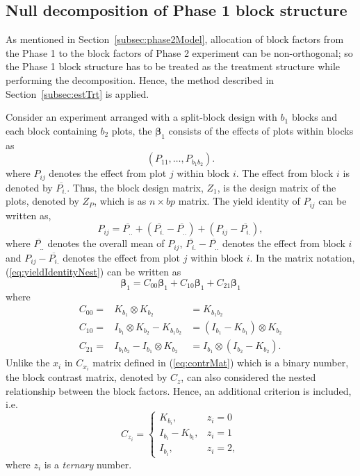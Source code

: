 \documentclass[article]{jss}
\begin{document}
\subsection{Null decomposition of Phase 1 block structure}
As mentioned in Section~\ref{subsec:phase2Model},  allocation of block factors from the Phase 1 to the block factors of Phase 2 experiment can be non-orthogonal; so the Phase 1 block structure has to be treated as the treatment structure while performing the decomposition. Hence, the method described in Section~\ref{subsec:estTrt} is applied. 

Consider an experiment arranged with a split-block design with $b_1$ blocks and each block containing $b_2$ plots, the $\bm{\beta}_1$  consists of the effects of plots within blocks as    
\begin{equation}\label{eq:blockParSplitBlk1}
 (P_{11}, \dots, P_{b_1 b_2}). 
\end{equation}
where $P_{ij}$ denotes the effect from plot $j$ within block $i$. The effect from block $i$ is denoted by $\overline{P_{i.}}$. Thus, the block design matrix, $Z_1$, is the design matrix of the plots, denoted by $Z_P$, which is as $n \times bp$ matrix. The yield identity of $P_{ij}$ can be written as,
\begin{equation}
\label{eq:yieldIdentityNest}
P_{ij} = \overline{P_{..}}+(\overline{P_{i.}} -\overline{P_{..}}) + (P_{ij} - \overline{P_{i.}}),
\end{equation}
where $\overline{P_{..}}$ denotes the overall mean of $P_{ij}$, $\overline{P_{i.}} -\overline{P_{..}}$ denotes the effect from block $i$ and $P_{ij} - \overline{P_{i.}}$ denotes the effect from plot $j$ within block $i$. In the matrix notation, (\ref{eq:yieldIdentityNest}) can be written as 
\[
\bm{\beta}_1 = C_{00} \bm{\beta}_1 + C_{10}\bm{\beta}_1 + C_{21}\bm{\beta}_1
\]
where
\begin{eqnarray}
\nonumber C_{00} = & K_{b_1} \otimes K_{b_2}& = K_{b_1 b_2}\\
\nonumber C_{10} = & I_{b_1} \otimes K_{b_2} - K_{b_1 b_2}& = (I_{b_1} - K_{b_1}) \otimes K_{b_2} \\
\nonumber C_{21} = & I_{b_1 b_2} - I_{b_1} \otimes K_{b_2} & =  I_{b_1} \otimes (I_{b_2} - K_{b_2}).
\end{eqnarray}
Unlike the $x_i$ in $C_{x_i}$ matrix defined in (\ref{eq:contrMat}) which is a binary number, the block contrast matrix, denoted by $C_z$, can also considered the nested relationship between the block factors. Hence, an additional criterion is included, i.e.\
\begin{equation}
\label{eq:contrMat1}
C_{z_i} =
   \begin{cases}
       K_{b_i}, & z_i = 0 \\
       I_{b_i} - K_{b_i}, & z_i = 1\\
        I_{b_i}, & z_i = 2,
    \end{cases}
\end{equation}
where $z_i$ is a \emph{ternary} number.
\end{document}
